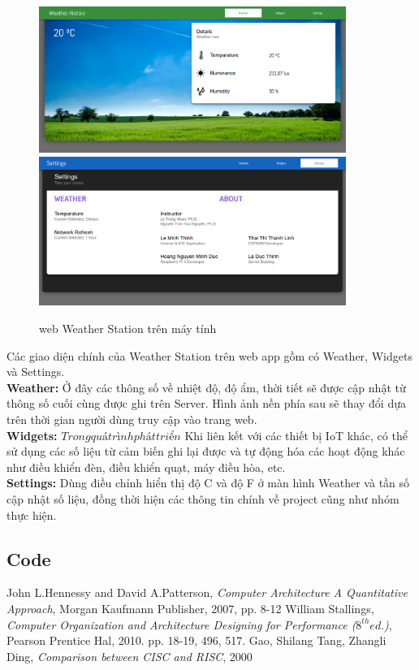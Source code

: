 \documentclass[12pt,titlepage,a4paper]{article}
\begin{document}
\begin{figure}[h]
    \centering
    \includegraphics[width=100mm]{Figures/wea_wide.png}\\
    \includegraphics[width=100mm]{Figures/sett_wide.png}
    \caption{web Weather Station trên máy tính}
    \label{wea_mobile}
\end{figure}
\newpage
Các giao diện chính của Weather Station trên web app gồm có Weather, Widgets và Settings.\\
\textbf{Weather: } Ở đây các thông số về nhiệt độ, độ ẩm, thời tiết sẽ được cập nhật từ thông số cuối cùng được ghi trên Server.
Hình ảnh nền phía sau sẽ thay đổi dựa trên thời gian người dùng truy cập vào trang web.\\
\textbf{Widgets: } \(Trong quá trình phát triển\) Khi liên kết với các thiết bị IoT khác, có thể sử dụng các số liệu từ cảm biến ghi lại được và tự động hóa các hoạt động khác như điều khiển đèn, điều khiển quạt, máy điều hòa, etc.\\
\textbf{Settings: } Dùng điều chỉnh hiển thị độ C và độ F ở màn hình Weather và tần số cập nhật số liệu, đồng thời hiện các thông tin chính về project cũng như nhóm thực hiện.


\subsection{Code}

\newpage
\begin{thebibliography}{39}
		John L.Hennessy and David A.Patterson, 
		\textit{Computer Architecture A Quantitative Approach}, Morgan Kaufmann Publisher, 2007, pp. 8-12
		William Stallings,
		\textit{Computer Organization and Architecture Designing for Performance ($8^{th} ed.$)}, Pearson Prentice Hal, 2010. pp. 18-19, 496, 517.
		Gao, Shilang Tang, Zhangli Ding,
		\textit{Comparison between CISC and RISC}, 2000
\end{thebibliography}
\end{document}
